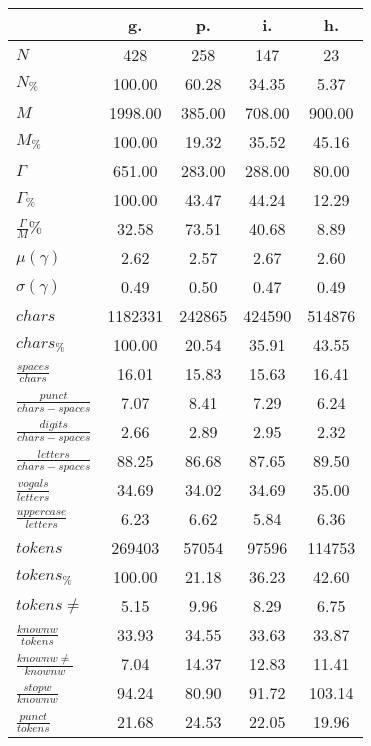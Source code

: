 \begin{table}[h!]
\begin{center}
\begin{tabular}{| l || c | c | c | c |}\hline
 & {\bf g.} & {\bf p.} & {\bf i.} & {\bf h.} \\\hline\hline
$N$ & 428  & 258  & 147  & 23 \\
$N_{\%}$ & 100.00  & 60.28  & 34.35  & 5.37 \\\hline
$M$ & 1998.00  & 385.00  & 708.00  & 900.00 \\
$M_{\%}$ & 100.00  & 19.32  & 35.52  & 45.16 \\\hline
$\Gamma$ & 651.00  & 283.00  & 288.00  & 80.00 \\
$\Gamma_{\%}$ & 100.00  & 43.47  & 44.24  & 12.29 \\\hline
$\frac{\Gamma}{M}\%$ & 32.58  & 73.51  & 40.68  & 8.89 \\
$\mu(\gamma)$ & 2.62  & 2.57  & 2.67  & 2.60 \\
$\sigma(\gamma)$ & 0.49  & 0.50  & 0.47  & 0.49 \\\hline\hline
$chars$ & 1182331  & 242865  & 424590  & 514876 \\
$chars_{\%}$ & 100.00  & 20.54  & 35.91  & 43.55 \\\hline
$\frac{spaces}{chars}$ & 16.01  & 15.83  & 15.63  & 16.41 \\
$\frac{punct}{chars-spaces}$ & 7.07  & 8.41  & 7.29  & 6.24 \\
$\frac{digits}{chars-spaces}$ & 2.66  & 2.89  & 2.95  & 2.32 \\\hline
$\frac{letters}{chars-spaces}$ & 88.25  & 86.68  & 87.65  & 89.50 \\
$\frac{vogals}{letters}$ & 34.69  & 34.02  & 34.69  & 35.00 \\
$\frac{uppercase}{letters}$ & 6.23  & 6.62  & 5.84  & 6.36 \\\hline\hline
$tokens$ & 269403  & 57054  & 97596  & 114753 \\
$tokens_{\%}$ & 100.00  & 21.18  & 36.23  & 42.60 \\
$tokens \neq$ & 5.15  & 9.96  & 8.29  & 6.75 \\\hline
$\frac{knownw}{tokens}$ & 33.93  & 34.55  & 33.63  & 33.87 \\
$\frac{knownw \neq}{knownw}$ & 7.04  & 14.37  & 12.83  & 11.41 \\\hline
$\frac{stopw}{knownw}$ & 94.24  & 80.90  & 91.72  & 103.14 \\
$\frac{punct}{tokens}$ & 21.68  & 24.53  & 22.05  & 19.96 \\

\end{tabular}
\end{center}
\end{table}
